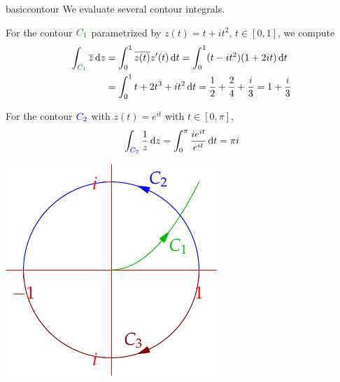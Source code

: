 \begin{examples}{}{basiccontour}
	We evaluate several contour integrals.
	\begin{enumerate}
	  \begin{minipage}[t]{0.65\linewidth}\vspace{-5pt}
		  \item For the contour $\textcolor{Green}{C_1}$ parametrized by $z(t)=t+it^2$, $t\in[0,1]$, we compute
		  \begin{align*}
			  \int_{\textcolor{Green}{C_1}}\cl z\,\dz
			  &=\int_0^1\cl{z(t)}z'(t)\,\dt
			  =\int_0^1(t-it^2)(1+2it)\,\dt\\
			  &=\int_0^1t+2t^3+it^2\,\dt
			  =\frac 12+\frac 24+\frac i3=1+\frac i3
		  \end{align*}
		  
		  \item For the contour $\textcolor{blue}{C_2}$ with $z(t)=e^{it}$ with $t\in[0,\pi]$,
		  \[
		  	\int_{\textcolor{blue}{C_2}}\frac 1z\,{\mathrm{d} z} =\int_0^{\pi}\frac{ie^{it}}{e^{it}}\,{\mathrm{d} t} =\pi i
		  \]
	  \end{minipage}
	  \hfill
	  \begin{minipage}[t]{0.34\linewidth}\vspace{-10pt}
	  	\flushright\includegraphics{contours-ex4}
	  \end{minipage}\par
	  \vspace{-10pt}
	  

\end{enumerate}
\end{examples}
